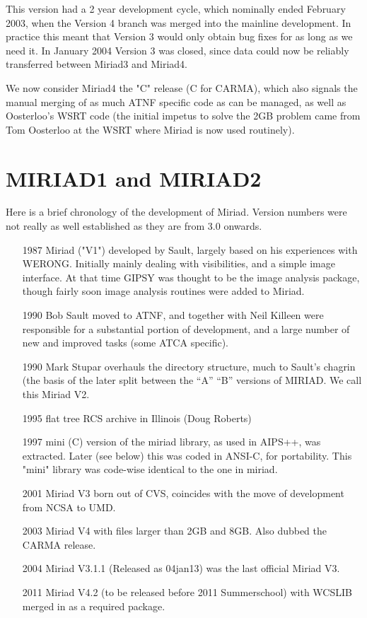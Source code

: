 This version had a 2 year development cycle, which nominally ended February 2003,
when the Version 4 branch was merged into the mainline development. 
In practice this meant that Version 3 would
only obtain bug fixes for as long as we need it. In January 2004 Version 3
was closed, since data could now be reliably transferred between
Miriad3 and Miriad4.

We now consider Miriad4 the "C" release (C for CARMA), which also signals the 
manual merging of as much ATNF specific code as can be managed, 
as well as Oosterloo's WSRT code (the initial
impetus to solve the 2GB problem came from Tom Oosterloo at the WSRT where Miriad
is now used routinely).


\section{MIRIAD1 and MIRIAD2}

Here is a brief chronology of the development of Miriad. Version numbers were not
really as well established as they are from 3.0 onwards.

\begin{enumerate}
\item[1987] Miriad ("V1") developed by Sault, largely based on his experiences
with WERONG. Initially mainly dealing with visibilities, and a simple image
interface. At that time GIPSY was thought to be the image analysis package,
though fairly soon image analysis routines were added to Miriad.

\item[1990] Bob Sault moved to ATNF, and together with Neil Killeen were
responsible for a substantial portion of development, and a large number
of new and improved tasks (some ATCA specific).

\item[1990] Mark Stupar overhauls the directory structure, much to Sault's
chagrin (the basis of the later split between the ``A'' ``B'' versions of
MIRIAD.  We call this Miriad V2.

\item[1995] flat tree RCS archive in Illinois (Doug Roberts)

\item[1997] mini (C) version of the miriad library, as used in AIPS++, was extracted. 
Later (see below) this was coded in ANSI-C, for portability. This "mini"
library was code-wise identical to the one in miriad.

\item[2001] Miriad V3 born out of CVS, coincides with the move of development from
NCSA to UMD.

\item[2003] Miriad V4 with files larger than 2GB and 8GB. 
Also dubbed the CARMA release.

\item[2004] Miriad V3.1.1 (Released as 04jan13) was the last official
Miriad V3.

\item[2011] Miriad V4.2 (to be released before 2011 Summerschool) with
WCSLIB merged in as a required package. 


\end{enumerate}

